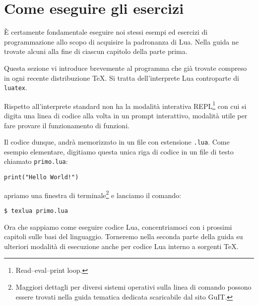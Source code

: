 

\section{Come eseguire gli esercizi}

È certamente fondamentale eseguire noi stessi esempi ed esercizi di
programmazione allo scopo di acquisire la padronanza di Lua. Nella guida ne
trovate alcuni alla fine di ciascun capitolo della parte prima. 

Questa sezione vi introduce brevemente al programma  che già
trovate compreso in ogni recente distribuzione \TeX{}. Si tratta dell'interprete
Lua controparte di \texttt{luatex}.

Rispetto all'interprete  standard  non ha la modalità
interativa REPL\footnote{Read–eval–print loop.} con cui si digita una linea di
codice alla volta in un prompt interattivo, modalità utile per fare provare il
funzionamento di funzioni.

Il codice dunque, andrà memorizzato in un file con estensione \texttt{.lua}.
Come esempio elementare, digitiamo questa unica riga di codice in un file
di testo chiamato \texttt{primo.lua}:
\begin{Verbatim}
print("Hello World!")
\end{Verbatim}
apriamo una finestra di terminale\footnote{Maggiori dettagli per diversi sistemi
operativi sulla linea di comando possono essere trovati nella guida tematica
dedicata scaricabile dal sito GuIT.} e lanciamo il comando:
\begin{Verbatim}
$ texlua primo.lua
\end{Verbatim}

Ora che sappiamo come eseguire codice Lua, concentriamoci con i prossimi
capitoli sulle basi del linguaggio. Torneremo nella seconda parte della guida su
ulteriori modalità di esecuzione anche per codice Lua interno a sorgenti \TeX.
